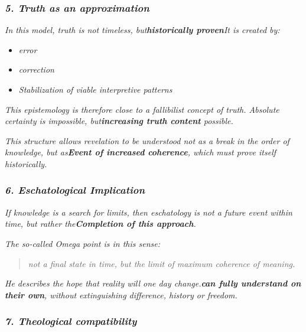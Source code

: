 \documentclass[
]{article}
\begin{document}
\subsubsection{\texorpdfstring{\emph{\textbf{5. Truth as an approximation}}}{5. Truth as an approximation}}\label{truth-as-an-approximation}

\emph{In this model, truth is not timeless, but\textbf{historically proven}It is created by:}

\begin{itemize}
\item
  \emph{error}
\item
  \emph{correction}
\item
  \emph{Stabilization of viable interpretive patterns}
\end{itemize}

\emph{This epistemology is therefore close to a fallibilist concept of truth. Absolute certainty is impossible, but\textbf{increasing truth content} possible.}

\emph{This structure allows revelation to be understood not as a break in the order of knowledge, but as\textbf{Event of increased coherence}, which must prove itself historically.}

\subsubsection{\texorpdfstring{\emph{\textbf{6. Eschatological Implication}}}{6. Eschatological Implication}}\label{eschatological-implication}

\emph{If knowledge is a search for limits, then eschatology is not a future event within time, but rather the\textbf{Completion of this approach}.}

\emph{The so-called Omega point is in this sense:}

\begin{quote}
\emph{not a final state in time, but the limit of maximum coherence of meaning.}
\end{quote}

\emph{He describes the hope that reality will one day change.\textbf{can fully understand on their own}, without extinguishing difference, history or freedom.}

\subsubsection{\texorpdfstring{\emph{\textbf{7. Theological compatibility}}}{7. Theological compatibility}}\label{theological-compatibility}
\end{document}
